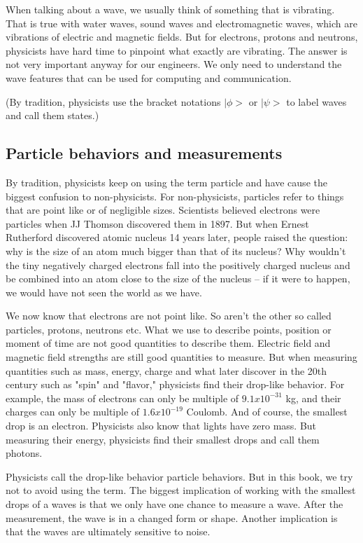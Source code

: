 \documentclass{book}
\begin{document}
When talking about a wave, we usually think of something that is vibrating. That is true with water waves, sound waves and electromagnetic waves, which are vibrations of electric and magnetic fields. But for electrons, protons and neutrons, physicists have hard time to pinpoint what exactly are vibrating. The answer is not very important anyway for our engineers. We only need to understand the wave features that can be used for computing and communication.

(By tradition, physicists use the bracket notations $|\phi>$ or $|\psi>$ to label waves and call them states.)

\subsection{Particle behaviors and measurements}
By tradition, physicists keep on using the term particle and have cause the biggest confusion to non-physicists. For non-physicists, particles refer to things that are point like or of negligible sizes. Scientists believed electrons were particles when JJ Thomson discovered them in 1897. But when Ernest Rutherford discovered atomic nucleus 14 years later, people raised the question: why is the size of an atom much bigger than that of its nucleus? Why wouldn't the tiny negatively charged electrons fall into the positively charged nucleus and be combined into an atom close to the size of the nucleus -- if it were to happen, we would have not seen the world as we have.

We now know that electrons are not point like. So aren't the other so called particles, protons, neutrons etc. What we use to describe points, position or moment of time are not good quantities to describe them. Electric field and magnetic field strengths are still good quantities to measure. But when measuring quantities such as mass, energy, charge and what later discover in the 20th century such as "spin" and "flavor," physicists find their drop-like behavior. For example, the mass of electrons can only be multiple of $9.1x10^{-31}$ kg, and their charges can only be multiple of $1.6x10^{-19}$ Coulomb. And of course, the smallest drop is an electron. Physicists also know that lights have zero mass. But measuring their energy, physicists find their smallest drops and call them photons.

Physicists call the drop-like behavior particle behaviors. But in this book, we try not to avoid using the term. The biggest implication of working with the smallest drops of a waves is that we only have one chance to measure a wave. After the measurement, the wave is in a changed form or shape. Another implication is that the waves are ultimately sensitive to noise.
\end{document}
